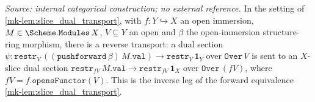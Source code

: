 \begin{lemma}\label{mk-lem:slice_dual_transport_inv}
  \leanok

  \textit{Source: internal categorical construction; no external reference.}
  In the setting of \ref{mk-lem:slice_dual_transport}, with \(f : Y \hookrightarrow X\) an open
  immersion, \(M \in \Scheme.\mathtt{Modules}\,X\), \(V \subseteq Y\) an open and \(\beta\)
  the open-immersion structure-ring morphism, there is a reverse transport: a dual section
  \(\psi : \mathtt{restr}_V\,((\mathtt{pushforward}\,\beta)\,M.\mathtt{val}) \to
  \mathtt{restr}_V\,\mathbf 1_Y\) over \(\mathtt{Over}\,V\) is sent to an \(X\)-slice dual
  section \(\mathtt{restr}_{fV}\,M.\mathtt{val} \to \mathtt{restr}_{fV}\,\mathbf 1_X\) over
  \(\mathtt{Over}\,(fV)\), where \(fV = f.\mathtt{opensFunctor}(V)\). This is the inverse leg
  of the forward equivalence \ref{mk-lem:slice_dual_transport}.
\end{lemma}
